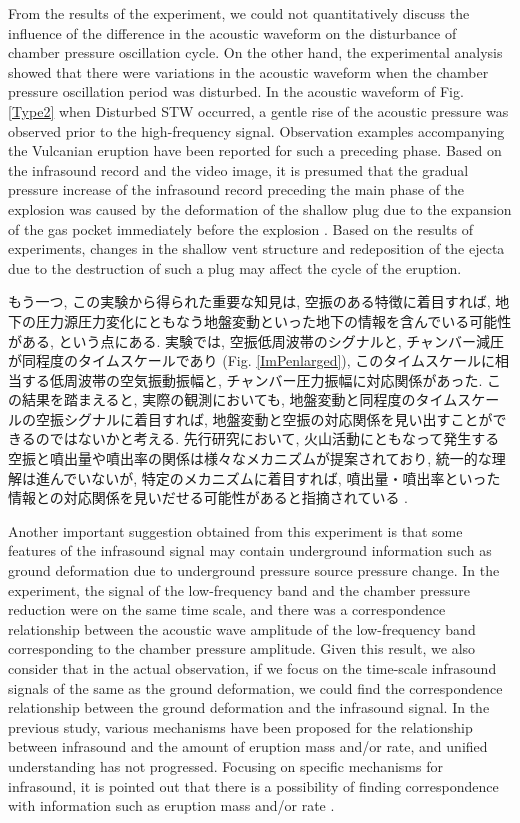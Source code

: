 \documentclass[12pt]{article}
\begin{document}
From the results of the experiment, we could not quantitatively discuss the influence of the difference in the acoustic waveform on the disturbance of chamber pressure oscillation cycle.
On the other hand, the experimental analysis showed that there were variations in the acoustic waveform when the chamber pressure oscillation period was disturbed.
In the acoustic waveform of Fig. \ref{Type2} when Disturbed STW occurred, a gentle rise of the acoustic pressure was observed prior to the high-frequency signal.
Observation examples accompanying the Vulcanian eruption have been reported for such a preceding phase.
Based on the infrasound record and the video image, it is presumed that the gradual pressure increase of the infrasound record preceding the main phase of the explosion was caused by the deformation of the shallow plug due to the expansion of the gas pocket immediately before the explosion \citep{Yokoo2009}.
Based on the results of experiments, changes in the shallow vent structure and redeposition of the ejecta due to the destruction of such a plug may affect the cycle of the eruption.


もう一つ, この実験から得られた重要な知見は, 空振のある特徴に着目すれば, 地下の圧力源圧力変化にともなう地盤変動といった地下の情報を含んでいる可能性がある, という点にある.
実験では, 空振低周波帯のシグナルと, チャンバー減圧が同程度のタイムスケールであり (Fig. \ref{ImPenlarged}), このタイムスケールに相当する低周波帯の空気振動振幅と, チャンバー圧力振幅に対応関係があった. 
この結果を踏まえると, 実際の観測においても, 地盤変動と同程度のタイムスケールの空振シグナルに着目すれば, 地盤変動と空振の対応関係を見い出すことができるのではないかと考える.
先行研究において, 火山活動にともなって発生する空振と噴出量や噴出率の関係は様々なメカニズムが提案されており, 統一的な理解は進んでいないが, 特定のメカニズムに着目すれば, 噴出量・噴出率といった情報との対応関係を見いだせる可能性があると指摘されている \citep{Ichihara2016a}.

Another important suggestion obtained from this experiment is that some features of the infrasound signal may contain underground information such as ground deformation due to underground pressure source pressure change.
In the experiment, the signal of the low-frequency band and the chamber pressure reduction were on the same time scale, and there was a correspondence relationship between the acoustic wave amplitude of the low-frequency band corresponding to the chamber pressure amplitude.
Given this result, we also consider that in the actual observation, if we focus on the time-scale infrasound signals of the same as the ground deformation, we could find the correspondence relationship between the ground deformation and the infrasound signal.
In the previous study, various mechanisms have been proposed for the relationship between infrasound and the amount of eruption mass and/or rate, and unified understanding has not progressed.
Focusing on specific mechanisms for infrasound, it is pointed out that there is a possibility of finding correspondence with information such as eruption mass and/or rate \citep{Ichihara2016a}.
\end{document}
